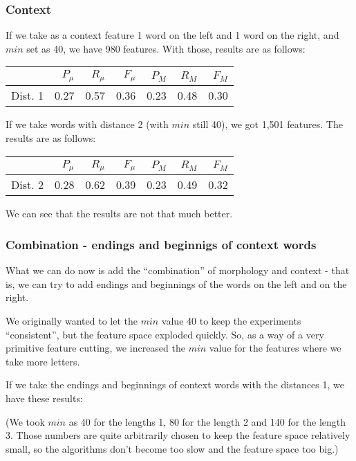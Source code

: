 \documentclass[letterpaper]{article}
\begin{document}
\subsubsection{Context}
If we take as a context feature 1 word on the left and 1 word on the right, and $min$ set as 40, we have 980 features. With those, results are as follows:


\begin{tabular}{|r|r|r|r|r|r|r|}
 \hline
 & $P_\mu$ & $R_\mu$ & $F_\mu$ & $P_M$ & $R_M$  & $F_M$ \\ \hline
Dist. 1 & 0.27 & 0.57 & 0.36 & 0.23 & 0.48 & 0.30 \\ \hline
\end{tabular}


If we take words with distance 2 (with $min$ still 40), we got 1,501 features. The results are as follows:

\begin{tabular}{|r|r|r|r|r|r|r|}
 \hline
 & $P_\mu$ & $R_\mu$ & $F_\mu$ & $P_M$ & $R_M$  & $F_M$ \\ \hline
Dist. 2 & 0.28 & 0.62 & 0.39 & 0.23 & 0.49 & 0.32 \\ \hline
\end{tabular}

We can see that the results are not that much better.

\subsubsection{Combination - endings and beginnigs of context words}
What we can do now is add the ``combination'' of morphology and context - that is, 
we can try to add endings and beginnings of the words on the left and on the right.

We originally wanted to let the $min$ value 40 to keep the experiments ``consistent'',
but the feature space exploded quickly. So, as a way of a very primitive feature cutting,
we increased the $min$ value for the features where we take more letters.

If we take the endings and beginnings of context words with the distances 1, we have these results:

(We took $min$ as 40 for the lengths 1, 80 for the length 2 and 140 for the length 3. 
Those numbers are quite arbitrarily chosen to keep the feature space relatively small, 
so the algorithms don't become too slow and the feature space too big.)
\end{document}
